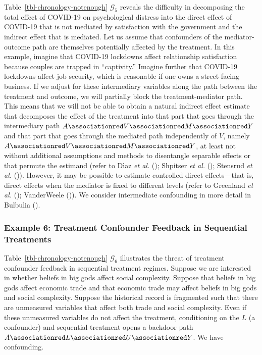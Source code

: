 \documentclass[
  single column]{article}
\begin{document}
Table~\ref{tbl-chronology-notenough} \(\mathcal{G}_5\) reveals the
difficulty in decomposing the total effect of COVID-19 on psychological
distress into the direct effect of COVID-19 that is not mediated by
satisfaction with the government and the indirect effect that is
mediated. Let us assume that confounders of the mediator-outcome path
are themselves potentially affected by the treatment. In this example,
imagine that COVID-19 lockdowns affect relationship satisfaction because
couples are trapped in ``captivity.'' Imagine further that COVID-19
lockdowns affect job security, which is reasonable if one owns a
street-facing business. If we adjust for these intermediary variables
along the path between the treatment and outcome, we will partially
block the treatment-mediator path. This means that we will not be able
to obtain a natural indirect effect estimate that decomposes the effect
of the treatment into that part that goes through the intermediary path
\(A \associationred V \associationred M \associationred Y\) and that
part that goes through the mediated path independently of \(V\), namely
\(A \associationred V \associationred M \associationred Y\), at least
not without additional assumptions and methods to disentangle separable
effects or that permute the estimand (refer to Dı́az \emph{et al.}
(); Shpitser \emph{et al.}
(); Stensrud \emph{et al.}
()). However, it may be
possible to estimate controlled direct effects---that is, direct effects
when the mediator is fixed to different levels (refer to Greenland
\emph{et al.} (); VanderWeele
()). We consider intermediate
confounding in more detail in Bulbulia
().

\subsubsection{Example 6: Treatment Confounder Feedback in Sequential
Treatments}\label{example-6-treatment-confounder-feedback-in-sequential-treatments}

Table~\ref{tbl-chronology-notenough} \(\mathcal{G}_6\) illustrates the
threat of treatment confounder feedback in sequential treatment regimes.
Suppose we are interested in whether beliefs in big gods affect social
complexity. Suppose that beliefs in big gods affect economic trade and
that economic trade may affect beliefs in big gods and social
complexity. Suppose the historical record is fragmented such that there
are unmeasured variables that affect both trade and social complexity.
Even if these unmeasured variables do not affect the treatment,
conditioning on the \(L\) (a confounder) and sequential treatment opens
a backdoor path
\(A \associationred L \associationred U \associationred Y\). We have
confounding.
\end{document}

